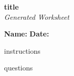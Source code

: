 \documentclass{article}
\begin{document}
\begin{center}
    \Huge \textbf{ {{title}} } \\[0.5cm]
    \large \textit{Generated Worksheet}
\end{center}

\vspace{1cm}

\noindent \textbf{Name:} \underline{\hspace{6cm}} \hfill \textbf{Date:} \underline{\hspace{4cm}}

\vspace{1cm}

{{instructions}}

\vspace{0.5cm}

\begin{enumerate}
{{questions}}
\end{enumerate}
\end{document}
